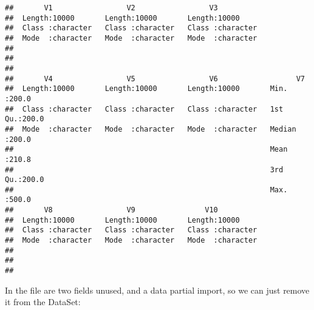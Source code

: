 \documentclass[]{article}
\newenvironment{Shaded}{\begin{snugshade}}{\end{snugshade}}
\newcommand{\CommentTok}[1]{\textcolor[rgb]{0.56,0.35,0.01}{\textit{#1}}}
\newcommand{\DecValTok}[1]{\textcolor[rgb]{0.00,0.00,0.81}{#1}}
\newcommand{\KeywordTok}[1]{\textcolor[rgb]{0.13,0.29,0.53}{\textbf{#1}}}
\newcommand{\NormalTok}[1]{#1}
\newcommand{\OperatorTok}[1]{\textcolor[rgb]{0.81,0.36,0.00}{\textbf{#1}}}
\newcommand{\StringTok}[1]{\textcolor[rgb]{0.31,0.60,0.02}{#1}}
\begin{document}
\begin{verbatim}
##       V1                 V2                 V3           
##  Length:10000       Length:10000       Length:10000      
##  Class :character   Class :character   Class :character  
##  Mode  :character   Mode  :character   Mode  :character  
##                                                          
##                                                          
##                                                          
##       V4                 V5                 V6                  V7       
##  Length:10000       Length:10000       Length:10000       Min.   :200.0  
##  Class :character   Class :character   Class :character   1st Qu.:200.0  
##  Mode  :character   Mode  :character   Mode  :character   Median :200.0  
##                                                           Mean   :210.8  
##                                                           3rd Qu.:200.0  
##                                                           Max.   :500.0  
##       V8                 V9                V10           
##  Length:10000       Length:10000       Length:10000      
##  Class :character   Class :character   Class :character  
##  Mode  :character   Mode  :character   Mode  :character  
##                                                          
##                                                          
## 
\end{verbatim}

In the file are two fields unused, and a data partial import, so we can
just remove it from the DataSet:

\begin{Shaded}
\end{Shaded}
\end{document}

